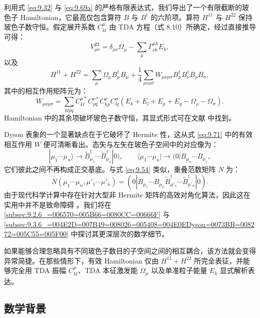 利用式 \ref{eq:9.32} 与 \ref{eq:9.69a} 的严格有限表达式，我们导出了一个有限截断的玻色子 Hamiltonian，它最高仅包含算符
$B$ 与 $B^{\dagger}$ 的六阶项。算符 $H^{11}$ 与 $H^{22}$ 保持玻色子数守恒。假定展开系数
$C^{\mu}_{kl}$ 由 TDA 方程（式 8.10）所确定，经过直接推导可得：
\begin{equation}
V^{22}_{\mu\nu}=\delta_{\mu\nu}\Omega_{\mu}-\sum_{k}\Gamma^{\mu k}_{\nu k}E_{k},\label{eq:9.70}
\end{equation}
以及
\begin{equation}
H^{11}+H^{22}=\sum_{\mu}\Omega_{\mu}B^{\dagger}_{\mu}B_{\mu}+\frac{1}{4}\sum_{\mu\nu\rho\sigma}W_{\mu\nu\rho\sigma}B^{\dagger}_{\mu}B^{\dagger}_{\nu}B_{\rho}B_{\sigma},\label{eq:9.71}
\end{equation}
其中的相互作用矩阵元为：
\begin{equation}
W_{\mu\nu\rho\sigma}=\sum_{klpq}C^{\mu*}_{kl}C^{\nu*}_{pq}C^{\rho}_{kp}C^{\sigma}_{lq}(E_{k}+E_{l}+E_{p}+E_{q}-\Omega_{\rho}-\Omega_{\sigma}).\label{eq:9.72}
\end{equation}
Hamiltonian 中的其余项破坏玻色子数守恒，其显式形式可在文献 \cite{RS77a} 中找到。

Dyson 表象的一个显著缺点在于它破坏了 Hermite 性，这从式 \ref{eq:9.71} 中的有效相互作用 $W$ 便可清晰看出。态矢与左矢在玻色子空间中的对应像为：
\[
|\mu_{1}\cdots\mu_{n}\rangle\to\tilde{B}^{\dagger}_{\mu_{1}}\cdots\tilde{B}^{\dagger}_{\mu_{n}}|0),\qquad\langle\mu_{1}\cdots\mu_{n}|\to(0|B_{\mu_{n}}\cdots B_{\mu_{1}},
\]
它们彼此之间不再构成正交基底。与式 \ref{eq:9.54} 类似，重叠范数矩阵 $N$ 为：
\begin{equation}
N(\mu_{1}\cdots\mu_{n},\mu'_{1}\cdots\mu'_{n})=(0|B_{\mu_{1}}\cdots B_{\mu_{n}}\tilde{B}^{\dagger}_{\mu'_{1}}\cdots\tilde{B}^{\dagger}_{\mu'_{n}}|0).\label{eq:9.73}
\end{equation}
由于现代科学计算中存在针对大型非 Hermite 矩阵的高效对角化算法，因此这在实用中并不是致命障碍 \cite{RS74b,SWR76,Sch76}。我们将在
\ref{subsec:9.2.6_=006570=005B66=0080CC=00666F} 与 \ref{subsec:9.3.6_=004E2D=007B49=008026=005408=004E0EDyson=0073BB=008272=005C55=005F00}
中探讨其更深层次的数学细节。

如果能够合理忽略具有不同玻色子数目的子空间之间的相互耦合，该方法就会变得异常简捷。在那些情形下，有效 Hamiltonian 仅由
$H^{11}+H^{22}$ 所完全表征，并能够完全用 TDA 振幅 $C^{\mu}_{kl}$、TDA 本征激发能 $\Omega_{\mu}$
以及单准粒子能量 $E_{k}$ 显式解析表达。

\subsection{数学背景\label{subsec:9.2.6_=006570=005B66=0080CC=00666F}}

